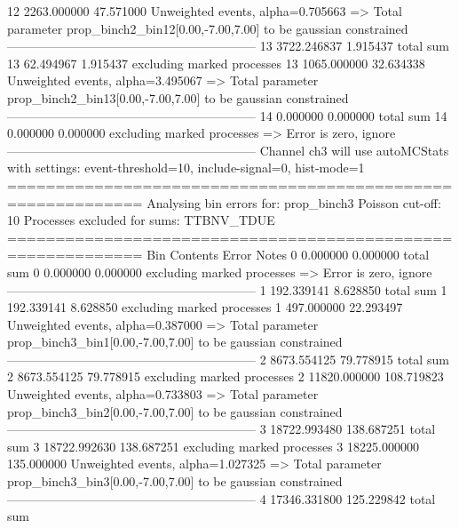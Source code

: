 12         2263.000000     47.571000       Unweighted events, alpha=0.705663
  => Total parameter prop_binch2_bin12[0.00,-7.00,7.00] to be gaussian constrained
------------------------------------------------------------
13         3722.246837     1.915437        total sum                     
13         62.494967       1.915437        excluding marked processes    
13         1065.000000     32.634338       Unweighted events, alpha=3.495067
  => Total parameter prop_binch2_bin13[0.00,-7.00,7.00] to be gaussian constrained
------------------------------------------------------------
14         0.000000        0.000000        total sum                     
14         0.000000        0.000000        excluding marked processes    
  => Error is zero, ignore      
------------------------------------------------------------
Channel ch3 will use autoMCStats with settings: event-threshold=10, include-signal=0, hist-mode=1
============================================================
Analysing bin errors for: prop_binch3
Poisson cut-off: 10
Processes excluded for sums: TTBNV_TDUE
============================================================
Bin        Contents        Error           Notes                         
0          0.000000        0.000000        total sum                     
0          0.000000        0.000000        excluding marked processes    
  => Error is zero, ignore      
------------------------------------------------------------
1          192.339141      8.628850        total sum                     
1          192.339141      8.628850        excluding marked processes    
1          497.000000      22.293497       Unweighted events, alpha=0.387000
  => Total parameter prop_binch3_bin1[0.00,-7.00,7.00] to be gaussian constrained
------------------------------------------------------------
2          8673.554125     79.778915       total sum                     
2          8673.554125     79.778915       excluding marked processes    
2          11820.000000    108.719823      Unweighted events, alpha=0.733803
  => Total parameter prop_binch3_bin2[0.00,-7.00,7.00] to be gaussian constrained
------------------------------------------------------------
3          18722.993480    138.687251      total sum                     
3          18722.992630    138.687251      excluding marked processes    
3          18225.000000    135.000000      Unweighted events, alpha=1.027325
  => Total parameter prop_binch3_bin3[0.00,-7.00,7.00] to be gaussian constrained
------------------------------------------------------------
4          17346.331800    125.229842      total sum                     

